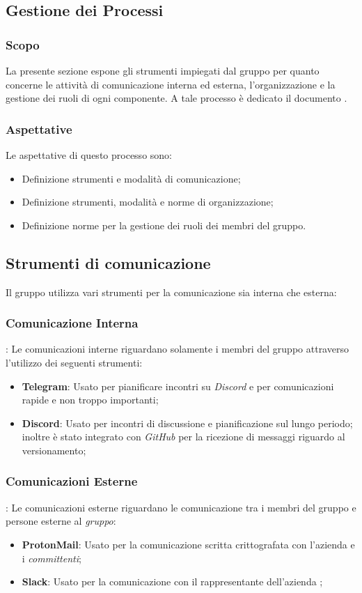 \subsection{Gestione dei Processi} %
\subsubsection{Scopo}
La presente sezione espone gli strumenti impiegati dal gruppo \teamname{} per quanto concerne le attività di comunicazione interna ed esterna, l'organizzazione e la gestione dei ruoli di ogni componente. %
A tale processo è dedicato il documento \PdP{}.

\subsubsection{Aspettative}
Le aspettative di questo processo sono:
\begin{itemize}
	\item Definizione strumenti e modalità di comunicazione;
	\item Definizione strumenti, modalità e norme di organizzazione;
	\item Definizione norme per la gestione dei ruoli dei membri del gruppo.
\end{itemize}

\subsection{Strumenti di comunicazione}
Il gruppo \teamname{} utilizza vari strumenti per la comunicazione sia interna che esterna:
	\subsubsection{Comunicazione Interna}:
		Le comunicazioni interne riguardano solamente i membri del gruppo \teamname{} attraverso l'utilizzo dei seguenti strumenti:
			\begin{itemize}
				\item \textbf{Telegram}: Usato per pianificare incontri su \emph{Discord} e per comunicazioni rapide e non troppo importanti;
				\item \textbf{Discord}: Usato per incontri di discussione e pianificazione sul lungo periodo; inoltre è stato integrato con \emph{GitHub} per la ricezione di messaggi riguardo al versionamento;
			\end{itemize}
	\subsubsection{Comunicazioni Esterne}:
		Le comunicazioni esterne riguardano le comunicazione tra i membri del gruppo \teamname{} e persone esterne al \emph{gruppo}:
			\begin{itemize}
				\item \textbf{ProtonMail}: Usato per la comunicazione scritta crittografata con l'azienda \proponente{} e i \emph{committenti};
				\item \textbf{Slack}: Usato per la comunicazione con il rappresentante dell'azienda \proponente{};
			\end{itemize}

